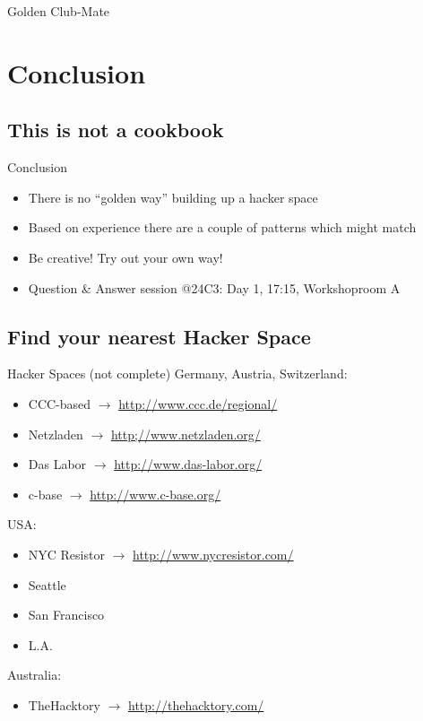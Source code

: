 \documentclass[mathserif]{beamer}
\newenvironment{itemizeframe}[1]
	{\begin{frame}{#1}\startitemizeframe}
	{\stopitemizeframe\end{frame}}
\newcommand\startitemizeframe{\begin{itemize}}
\newcommand\stopitemizeframe{\end{itemize}}
\begin{document}
\begin{frame}[plain]{Golden Club-Mate}
	\begin{center}
	\end{center}
\end{frame}


\section{Conclusion}

\subsection{This is not a cookbook}
\begin{itemizeframe}{Conclusion}
	\item There is no “golden way” building up a hacker space
	\item Based on experience there are a couple of patterns which might match
	\item Be creative!  Try out your own way!
		\vspace{2em}
	\item Question \& Answer session @24C3: Day 1, 17:15, Workshoproom A
\end{itemizeframe}

\subsection{Find your nearest Hacker Space}
\begin{frame}{Hacker Spaces (not complete)}
	Germany, Austria, Switzerland:
	\begin{itemize}
		\item CCC-based $\rightarrow$ \url{http://www.ccc.de/regional/}
		\item Netzladen $\rightarrow$ \url{http;//www.netzladen.org/}
		\item Das Labor $\rightarrow$ \url{http://www.das-labor.org/}
		\item c-base $\rightarrow$ \url{http://www.c-base.org/}
	\end{itemize}
	USA:
	\begin{itemize}
		\item NYC Resistor $\rightarrow$ \url{http://www.nycresistor.com/}
		\item Seattle
		\item San Francisco
		\item L.A.
	\end{itemize}
	Australia:
	\begin{itemize}
		\item TheHacktory $\rightarrow$ \url{http://thehacktory.com/}
	\end{itemize}
\end{frame}
\end{document}
